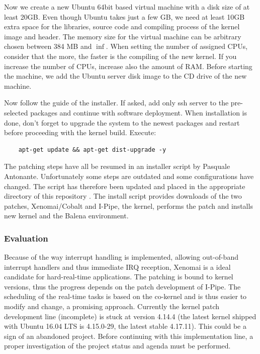 \documentclass[]{scrartcl}
\begin{document}
Now we create a new Ubuntu 64bit based virtual machine with a disk size of at least 20GB. Even though Ubuntu takes just a few GB, we need at least 10GB extra space for the libraries, source code and compiling process of the kernel image and header. 
The memory size for the virtual machine can be arbitrary chosen between 384 MB and $\inf$. When setting the number of assigned CPUs, consider that the more, the faster is the compiling of the new kernel. If you increase the number of CPUs, increase also the amount of RAM.
Before starting the machine, we add the Ubuntu server disk image to the CD drive of the new machine.

Now follow the guide of the installer. If asked, add only ssh server to the pre-selected packages and continue with software deployment. When installation is done, don't forget to upgrade the system to the newest packages and restart before proceeding with the kernel build. Execute:

\begin{verbatim}
	apt-get update && apt-get dist-upgrade -y
\end{verbatim}

The patching steps have all be resumed in an installer script by Pasquale Antonante. Unfortunately some steps are outdated and some configurations have changed. The script has therefore been updated and placed in the appropriate directory of this repository \cite{gitrepo}. The install script provides downloads of the two patches, Xenomai/Cobalt and I-Pipe, the kernel, performs the patch and installs new kernel and the Balena environment.

\subsubsection{Evaluation}

Because of the way interrupt handling is implemented, allowing out-of-band interrupt handlers and thus immediate IRQ reception, Xenomai is a ideal candidate for hard-real-time applications. The patching is bound to kernel versions, thus the progress depends on the patch development of I-Pipe. 
The scheduling of the real-time tasks is based on the co-kernel and is thus easier to modify and change, a promising approach.
Currently the kernel patch development line (incomplete) is stuck at version 4.14.4 (the latest kernel shipped with Ubuntu 16.04 LTS is 4.15.0-29, the latest stable 4.17.11). This could be a sign of an abandoned project. Before continuing with this implementation line, a proper investigation of the project status and agenda must be performed.
\end{document}
